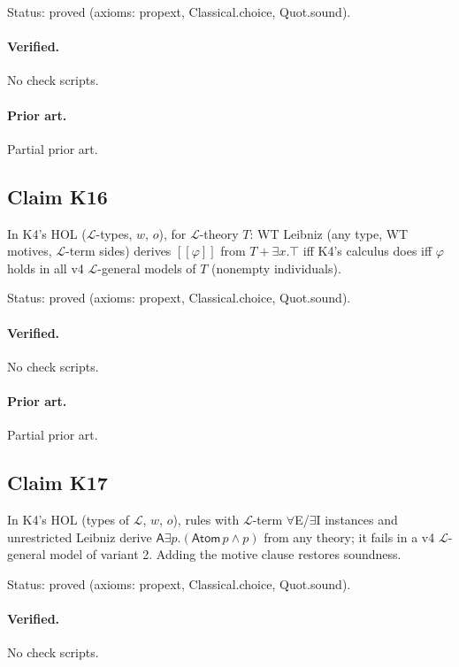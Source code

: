 \documentclass{article}
\begin{document}
Status: proved (axioms: propext, Classical.choice, Quot.sound).

\paragraph{Verified.}
No check scripts.

\paragraph{Prior art.} Partial prior art.

\subsection*{Claim K16}

In K4's HOL ($\mathcal L$-types, $w$, $o$), for $\mathcal L$-theory $T$: WT Leibniz (any type, WT motives, $\mathcal L$-term sides) derives $[\![\varphi]\!]$ from $T+\exists x.\top$ iff K4's calculus does iff $\varphi$ holds in all v4 $\mathcal L$-general models of $T$ (nonempty individuals).

Status: proved (axioms: propext, Classical.choice, Quot.sound).

\paragraph{Verified.}
No check scripts.

\paragraph{Prior art.} Partial prior art.

\subsection*{Claim K17}

In K4's HOL (types of $\mathcal L$, $w$, $o$), rules with $\mathcal L$-term $\forall$E/$\exists$I instances and unrestricted Leibniz derive $\mathsf A\exists p.(\mathsf{Atom}\,p\wedge p)$ from any theory; it fails in a v4 $\mathcal L$-general model of variant 2. Adding the motive clause restores soundness.

Status: proved (axioms: propext, Classical.choice, Quot.sound).

\paragraph{Verified.}
No check scripts.
\end{document}
